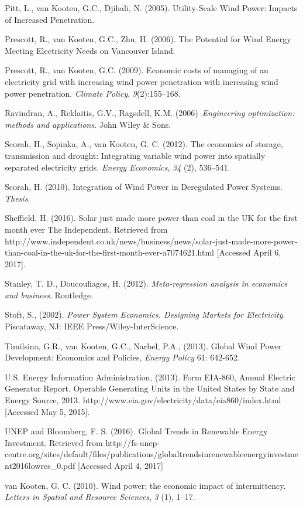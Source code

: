 \documentclass[10pt,letter]{article}
\begin{document}
Pitt, L., van Kooten, G.C., Djihali, N. (2005). Utility-Scale Wind
Power: Impacts of Increased Penetration.

Prescott, R., van Kooten, G.C., Zhu, H. (2006). The Potential for Wind
Energy Meeting Electricity Needs on Vancouver Island.

Prescott, R., van Kooten, G.C. (2009). Economic costs of managing of an
electricity grid with increasing wind power penetration with increasing
wind power penetration. \emph{Climate Policy}, \emph{9}(2):155--168.

Ravindran, A., Reklaitis, G.V., Ragsdell, K.M. (2006)~\emph{Engineering
optimization: methods and applications}. John Wiley \& Sons.

Scorah, H., Sopinka, A., van Kooten, G. C. (2012). The economics of
storage, transmission and drought: Integrating variable wind power into
spatially separated electricity grids. \emph{Energy Economics},
\emph{34} (2), 536--541.

Scorah, H. (2010). Integration of Wind Power in Deregulated Power
Systems. \emph{Thesis}.

Sheffield, H. (2016). Solar just made more power than coal in the UK for
the first month ever \textbar{} The Independent. Retrieved from
http://www.independent.co.uk/news/business/news/solar-just-made-more-power-than-coal-in-the-uk-for-the-first-month-ever-a7074621.html
{[}Accessed April 6, 2017{]}.

Stanley, T. D., Doucouliagos, H. (2012). \emph{Meta-regression analysis
in economics and business}. Routledge.

Stoft, S., (2002). \emph{Power System Economics. Designing Markets for
Electricity}. Piscataway, NJ: IEEE Press/Wiley-InterScience.

Timilsina, G.R., van Kooten, G.C., Narbel, P.A., (2013). Global Wind
Power Development: Economics and Policies, \emph{Energy Policy} 61:
642-652.

U.S. Energy Information Administration, (2013). Form EIA-860, Annual
Electric Generator Report. Operable Generating Units in the United
States by State and Energy Source, 2013.
http://www.eia.gov/electricity/data/eia860/index.html {[}Accessed May 5,
2015{]}.

UNEP and Bloomberg, F. S. (2016). Global Trends in Renewable Energy
Investment. Retrieved from
http://fs-unep-centre.org/sites/default/files/publications/globaltrendsinrenewableenergyinvestment2016lowres\_0.pdf
{[}Accessed April 4, 2017{]}

van Kooten, G. C. (2010). Wind power: the economic impact of
intermittency. \emph{Letters in Spatial and Resource Sciences},
\emph{3} (1), 1--17.
\end{document}
